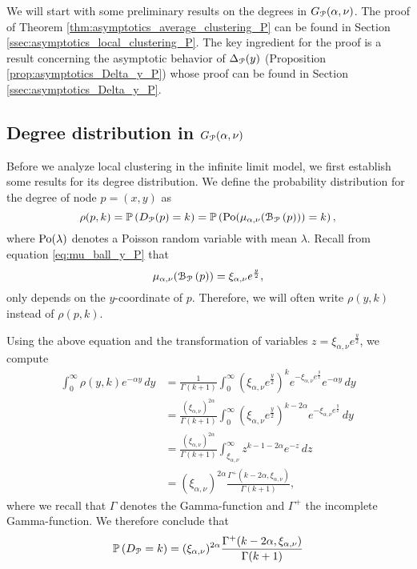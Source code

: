 We will start with some preliminary results on the degrees in $G_{{\mathcal P}}(\alpha, \nu)$. The proof of Theorem \ref{thm:asymptotics_average_clustering_P} can be found in Section \ref{ssec:asymptotics_local_clustering_P}. The key ingredient for the proof is a result concerning the asymptotic behavior of $\Delta_{{\mathcal P}}(y)$ (Proposition \ref{prop:asymptotics_Delta_y_P}) whose proof can be found in Section \ref{ssec:asymptotics_Delta_y_P}.

\subsection{Degree distribution in $G_{{\mathcal P}}(\alpha, \nu)$}

Before we analyze local clustering in the infinite limit model, we first establish some results for its degree distribution. We define the probability distribution for the degree of node $p = (x,y)$ as
\begin{equation}
	\rho(p,k) = \mathbb{P}\left(D_{{\mathcal P}}(p) = k\right) = \mathbb{P}\left({\mathrm{Po}}(\mu_{\alpha,\nu}({\mathcal B}_{{\mathcal P}}\left(p\right))) = k\right),
\end{equation}
where ${\mathrm{Po}}(\lambda)$ denotes a Poisson random variable with mean $\lambda$. Recall from equation \eqref{eq:mu_ball_y_P} that
\[
	\mu_{\alpha,\nu}({\mathcal B}_{{\mathcal P}}\left(p\right)) = \xi_{\alpha,\nu} e^{\frac{y}{2}},
\]
only depends on the $y$-coordinate of $p$. Therefore, we will often write $\rho(y,k)$ instead of $\rho(p,k)$.

Using the above equation and the transformation of variables $z = \xi_{\alpha,\nu}e^{\frac{y}{2}}$, we compute
\begin{align*}
	\int_0^\infty \rho(y,k) e^{-\alpha y} \, dy 
    &= \frac{1}{\Gamma(k+1)} \int_0^\infty \left(\xi_{\alpha,\nu} e^{\frac{y}{2}}\right)^k 
    	e^{-\xi_{\alpha,\nu} e^{\frac{y}{2}}} e^{-\alpha y} \, dy\\
    &= \frac{(\xi_{\alpha,\nu})^{2\alpha}}{\Gamma(k+1)} \int_0^\infty 
    	\left(\xi_{\alpha,\nu} e^{\frac{y}{2}}\right)^{k - 2\alpha} e^{-\xi_{\alpha,\nu} e^{\frac{y}{2}}}
        \, dy\\
    &= \frac{(\xi_{\alpha,\nu})^{2\alpha}}{\Gamma(k+1)} \int_{\xi_{\alpha,\nu}}^{\infty} 
    	z^{k - 1 -2\alpha} e^{-z} \, dz\\
    &= (\xi_{\alpha,\nu})^{2\alpha} \frac{\Gamma^+(k - 2\alpha, \xi_{\alpha,\nu})}{\Gamma(k+1)},
\end{align*}
where we recall that $\Gamma$ denotes the Gamma-function and $\Gamma^{+}$ the incomplete Gamma-function.
We therefore conclude that
\begin{equation}\label{eq:degree_distribution_P}
	\mathbb{P}\left(D_{{\mathcal P}} = k\right) = (\xi_{\alpha,\nu})^{2\alpha} \frac{\Gamma^+(k - 2\alpha, \xi_{\alpha,\nu})}{\Gamma(k+1)}
\end{equation}

